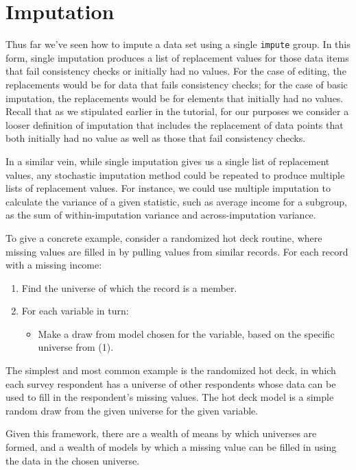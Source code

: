 \documentclass{article}
\def\tighten{ \setlength{\itemsep}{1pt}
    \setlength{\parskip}{0pt}}
\begin{document}
\section{Imputation}\label{impsec}
Thus far we've seen how to impute a data set using a single {\tt impute} group. In this form, single 
imputation produces a list of replacement values for those data items that fail consistency checks 
or initially had no values. For the case of editing, the replacements would be for data that fails 
consistency checks; for the case of basic imputation, the replacements would be for elements that
initially had no values. Recall that as we stipulated earlier in the tutorial, for our purposes we 
consider a looser definition of imputation that includes the replacement of data points that both 
initially had no value as well as those that fail consistency checks.

In a similar vein, while single imputation gives us a single list of replacement values, any stochastic 
imputation method could be repeated to produce multiple lists of replacement values. For instance, 
we could use multiple imputation to calculate the variance of a given statistic, such as average 
income for a subgroup, as the sum of within-imputation variance and across-imputation variance.

To give a concrete example, consider a randomized hot deck routine, where missing values are
filled in by pulling values from similar records. For each record with a missing income:
\begin{enumerate}
\tighten
\item Find the universe of which the record is a member.
\item For each variable in turn:
    \begin{itemize}
    \item Make a draw from model chosen for the variable, based on the specific universe from (1).
    \end{itemize}
\end{enumerate}


The simplest and most common example is the randomized hot deck, in which each survey respondent 
has a universe of other respondents whose data can be used to fill in the respondent's missing
values. The hot deck model is a simple random draw from the given universe for the given variable.

Given this framework, there are a wealth of means by which universes are formed, and
a wealth of models by which a missing value can be filled in using the data in the chosen universe.
\end{document}
